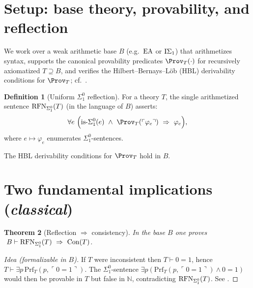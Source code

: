\documentclass[11pt]{article}
\newtheorem{theorem}{Theorem}[section]
\theoremstyle{definition}
\newtheorem{definition}[theorem]{Definition}
\theoremstyle{remark}
\begin{document}
\section{Setup: base theory, provability, and reflection}

We work over a weak arithmetic base \(B\) (e.g.\ \(\mathrm{EA}\) or \(\mathrm{I}\Sigma_1\)) that arithmetizes syntax,
supports the canonical provability predicates \(\Prov_T(\cdot)\) for recursively axiomatized \(T\supseteq B\),
and verifies the Hilbert–Bernays–L\"ob (HBL) derivability conditions for \(\Prov_T\); cf.\ \cite{HajekPudlak}.

\begin{definition}[Uniform $\Sigma^0_1$ reflection]\label{V:def:RFN}
For a theory \(T\), the single arithmetized sentence \(\mathrm{RFN}_{\Sigma^0_1}(T)\) (in the language of \(B\)) asserts:
\[
\forall e\ \Big(\mathrm{is}\text{-}\Sigma^0_1(e)\ \wedge\ \Prov_T(\ulcorner \varphi_e\urcorner)\ \Rightarrow\ \varphi_e\Big),
\]
where \(e\mapsto \varphi_e\) enumerates \(\Sigma^0_1\)-sentences.
\end{definition}

\begin{assumption}\label{V:ass:HBL}
The HBL derivability conditions for \(\Prov_T\) hold in \(B\).
\end{assumption}

\section{Two fundamental implications (\emph{classical})}

\begin{theorem}[Reflection $\Rightarrow$ consistency]\label{V:thm:RFN-implies-Con}
In the base \(B\) one proves \(\ B\vdash \RFNSigOne(T)\ \Rightarrow\ \Con(T)\).
\end{theorem}

\begin{proof}[Idea (formalizable in \(B\))]
If \(T\) were inconsistent then \(T\vdash 0=1\), hence \(T\vdash \exists p\,\mathrm{Prf}_T(p,\ulcorner 0=1\urcorner)\).
The \(\Sigma^0_1\)-sentence \(\exists p(\mathrm{Prf}_T(p,\ulcorner 0=1\urcorner)\wedge 0=1)\) would then be provable in \(T\) but false in \(\mathbb N\), contradicting \(\mathrm{RFN}_{\Sigma^0_1}(T)\). See \cite[§I]{HajekPudlak}.
\end{proof}
\end{document}
